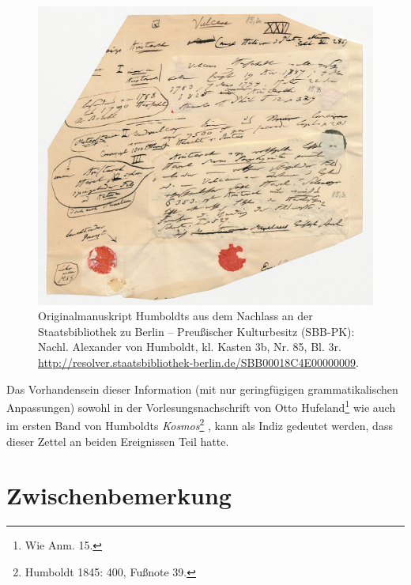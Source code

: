 \documentclass[a4paper,
fontsize=11pt,
oneside,
numbers=noperiodatend,
parskip=half-,
bibliography=totoc,
final
]{scrartcl}
\begin{document}
\begin{figure}[htbp]
\centering
\includegraphics{img/01.jpg}
\caption{Originalmanuskript Humboldts aus dem Nachlass an der
Staatsbibliothek zu Berlin -- Preußischer Kulturbesitz (SBB-PK): Nachl.
Alexander von Humboldt, kl. Kasten 3b, Nr. 85, Bl. 3r.
\url{http://resolver.staatsbibliothek-berlin.de/SBB00018C4E00000009}.}
\end{figure}

Das Vorhandensein dieser Information (mit nur geringfügigen
grammatikalischen Anpassungen) sowohl in der Vorlesungsnachschrift von
Otto Hufeland\footnote{Wie Anm. 15.} wie auch im ersten Band von
Humboldts \emph{Kosmos}\footnote{Humboldt 1845: 400, Fußnote 39.} , kann
als Indiz gedeutet werden, dass dieser Zettel an beiden Ereignissen Teil
hatte.

\section*{Zwischenbemerkung}\label{zwischenbemerkung}
\end{document}
